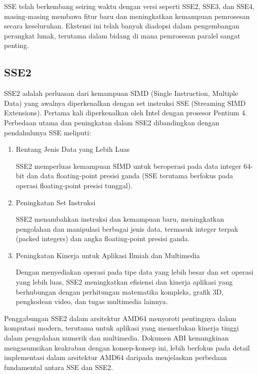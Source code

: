 SSE telah berkembang seiring waktu dengan versi seperti SSE2, SSE3, dan SSE4, masing-masing membawa fitur baru dan meningkatkan kemampuan pemrosesan secara keseluruhan. Ekstensi ini telah banyak diadopsi dalam pengembangan perangkat lunak, terutama dalam bidang di mana pemrosesan paralel sangat penting.

\subsection{SSE2}
SSE2 adalah perluasan dari kemampuan SIMD (Single Instruction, Multiple Data) yang awalnya diperkenalkan dengan set instruksi SSE (Streaming SIMD Extensions). Pertama kali diperkenalkan oleh Intel dengan prosesor Pentium 4\cite{SystemVAppBinaryInterfaceMichael}. Perbedaan utama dan peningkatan dalam SSE2 dibandingkan dengan pendahulunya SSE meliputi:

\begin{enumerate}
	\item Rentang Jenis Data yang Lebih Luas

	      SSE2 memperluas kemampuan SIMD untuk beroperasi pada data integer 64-bit dan data floating-point presisi ganda (SSE terutama berfokus pada operasi floating-point presisi tunggal).

	\item Peningkatan Set Instruksi

	      SSE2 menambahkan instruksi dan kemampuan baru, meningkatkan pengolahan dan manipulasi berbagai jenis data, termasuk integer terpak (packed integers) dan angka floating-point presisi ganda.

	\item Peningkatan Kinerja untuk Aplikasi Ilmiah dan Multimedia

	      Dengan menyediakan operasi pada tipe data yang lebih besar dan set operasi yang lebih luas, SSE2 meningkatkan efisiensi dan kinerja aplikasi yang berhubungan dengan perhitungan matematika kompleks, grafik 3D, pengkodean video, dan tugas multimedia lainnya.
\end{enumerate}

Penggabungan SSE2 dalam arsitektur AMD64 menyoroti pentingnya dalam komputasi modern, terutama untuk aplikasi yang memerlukan kinerja tinggi dalam pengolahan numerik dan multimedia. Dokumen ABI kemungkinan mengasumsikan keakraban dengan konsep-konsep ini, lebih berfokus pada detail implementasi dalam arsitektur AMD64 daripada menjelaskan perbedaan fundamental antara SSE dan SSE2\cite{SystemVAppBinaryInterfaceMichael}.

